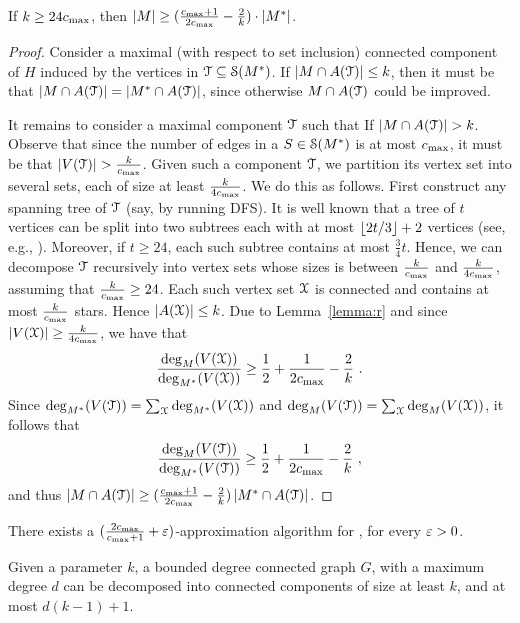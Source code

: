 \begin{lemma}
If $k \geq 24c_{\max}$, then $\left| M \right| \geq (\frac{c_{\max}+1}{2c_{\max}}
- \frac{2}{k}) \cdot \left| M^* \right|$.
\end{lemma}
\begin{proof}
Consider a maximal (with respect to set inclusion) connected component
of $H$ induced by the vertices in $\mathcal{T} \subseteq \mathcal{S}(M^*)$.
%
If $\left| M \cap A(\mathcal{T}) \right| \leq k$, then it must be that $\left| M \cap
A(\mathcal{T}) \right| = \left| M^* \cap A(\mathcal{T}) \right|$, since otherwise $M \cap
A(\mathcal{T})$ could be improved.

It remains to consider a maximal component $\mathcal{T}$ such that If
$\left| M \cap A(\mathcal{T}) \right| > k$.  Observe that since the number of edges
in a $S \in \mathcal{S}(M^*)$ is at most $c_{\max}$, it must be that
$\left| V(\mathcal{T}) \right| > \frac{k}{c_{\max}}$.
%
Given such a component $\mathcal{T}$, we partition its vertex set into
several sets, each of size at least $\frac{k}{4c_{\max}}$.  We do this as
follows.  First construct any spanning tree of $\mathcal{T}$ (say, by
running DFS).  It is well known that a tree of $t$ vertices can be
split into two subtrees each with at most $\left\lfloor 2t/3 \right\rfloor+2$ vertices
(see, e.g., \cite{???}).  Moreover, if $t \geq 24$, each such subtree
contains at most $\frac{3}{4}t$.  Hence, we can decompose $\mathcal{T}$
recursively into vertex sets whose sizes is between $\frac{k}{c_{\max}}$
and $\frac{k}{4c_{\max}}$, assuming that $\frac{k}{c_{\max}} \geq 24$.
%
Each such vertex set $\mathcal{X}$ is connected and contains at most
$\frac{k}{c_{\max}}$ stars.  Hence $\left| A(\mathcal{X}) \right| \leq k$.  Due to
Lemma~\ref{lemma:r} and since $\left| V(\mathcal{X}) \right| \geq \frac{k}{4c_{\max}}$,
we have that
\[
\frac{\deg_M(V(\mathcal{X}))}{\deg_{M^*}(V(\mathcal{X}))} 
\geq \frac{1}{2} + \frac{1}{2c_{\max}} - \frac{2}{k}
~.
\]
Since $\deg_{M^*}(V(\mathcal{T})) = \sum_{\mathcal{X}} \deg_{M^*}(V(\mathcal{X}))$ and
$\deg_M(V(\mathcal{T})) = \sum_{\mathcal{X}} \deg_M(V(\mathcal{X}))$, it follows that
\[
\frac{\deg_M(V(\mathcal{T}))}{\deg_{M^*}(V(\mathcal{T}))}
\geq \frac{1}{2} + \frac{1}{2c_{\max}} - \frac{2}{k}
~,
\]
and thus $\left| M \cap A(\mathcal{T}) \right| \geq (\frac{c_{\max} + 1}{2c_{\max}}
- \frac{2}{k}) \left| M^* \cap A(\mathcal{T}) \right|$.
\end{proof}


\begin{corollary}
\label{cor:local}
There exists a $(\frac{2c_{\max}}{c_{\max}+1} +\varepsilon)$-approximation
algorithm for \carpool, for every $\varepsilon>0$.
\end{corollary}


\iffalse %

\begin{lemma}
\label{lemma:dec}
Given a parameter $k$, a bounded degree connected graph $G$, with a
maximum degree $d$ can be decomposed into connected components of size
at least $k$, and at most $d(k-1) + 1$.
\end{lemma}

